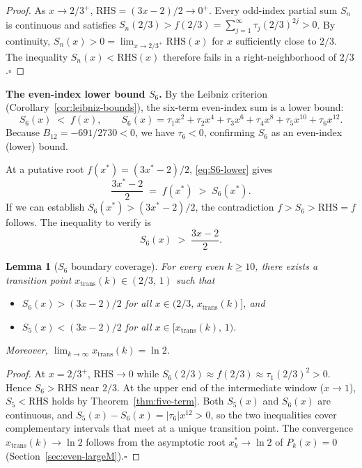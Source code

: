 \documentclass[12pt,a4paper]{article}
\theoremstyle{plain}
\newtheorem{lemma}[theorem]{Lemma}
\theoremstyle{definition}
\begin{document}
\begin{proof}
  As $x \to 2/3^+$, $\mathrm{RHS} = (3x-2)/2 \to 0^+$.
  Every odd-index partial sum $S_n$ is continuous and satisfies
  $S_n(2/3) > f(2/3) = \sum_{j=1}^{\infty} \tau_j (2/3)^{2j} > 0$.
  By continuity, $S_n(x) > 0 = \lim_{x \to 2/3^+} \mathrm{RHS}(x)$
  for $x$ sufficiently close to $2/3$.  The inequality
  $S_n(x) < \mathrm{RHS}(x)$ therefore fails in a right-neighborhood
  of $2/3$.\hfill$\square$
\end{proof}

\medskip
\noindent\textbf{The even-index lower bound $S_6$.}
By the Leibniz criterion (Corollary~\ref{cor:leibniz-bounds}),
the six-term even-index sum is a lower bound:
\begin{equation}\label{eq:S6-lower}
  S_6(x) \; < \; f(x), \qquad
  S_6(x) = \tau_1 x^2 + \tau_2 x^4 + \tau_3 x^6
          + \tau_4 x^8 + \tau_5 x^{10} + \tau_6 x^{12}.
\end{equation}
Because $B_{12} = -691/2730 < 0$, we have $\tau_6 < 0$, confirming
$S_6$ as an even-index (lower) bound.

At a putative root $f(x^*) = (3x^*-2)/2$, \eqref{eq:S6-lower} gives
\[
  \frac{3x^*-2}{2} \; = \; f(x^*) \; > \; S_6(x^*).
\]
If we can establish $S_6(x^*) > (3x^*-2)/2$, the contradiction
$f > S_6 > \mathrm{RHS} = f$ follows.  The inequality to verify is
\begin{equation}\label{eq:S6-bound-ineq}
  S_6(x) \; > \; \frac{3x-2}{2}.
\end{equation}

\begin{lemma}[$S_6$ boundary coverage]\label{lem:S6-boundary}
  For every even $k \ge 10$, there exists a transition point
  $x_{\mathrm{trans}}(k) \in (2/3,\, 1)$ such that
  \begin{itemize}[nosep]
    \item $S_6(x) > (3x-2)/2$ for all $x \in (2/3,\, x_{\mathrm{trans}}(k)]$, and
    \item $S_5(x) < (3x-2)/2$ for all $x \in [x_{\mathrm{trans}}(k),\, 1)$.
  \end{itemize}
  Moreover, $\lim_{k\to\infty} x_{\mathrm{trans}}(k) = \ln 2$.
\end{lemma}

\begin{proof}
  At $x = 2/3^+$, $\mathrm{RHS} \to 0$ while $S_6(2/3) \approx f(2/3)
  \approx \tau_1 (2/3)^2 > 0$.  Hence $S_6 > \mathrm{RHS}$ near $2/3$.
  At the upper end of the intermediate window ($x \to 1$), $S_5 < \mathrm{RHS}$
  holds by Theorem~\ref{thm:five-term}.  Both $S_5(x)$ and $S_6(x)$ are
  continuous, and $S_5(x) - S_6(x) = |\tau_6|x^{12} > 0$, so the two
  inequalities cover complementary intervals that meet at a unique
  transition point.  The convergence $x_{\mathrm{trans}}(k) \to \ln 2$
  follows from the asymptotic root $x^*_k \to \ln 2$ of $P_k(x) = 0$
  (Section~\ref{sec:even-largeM}).\hfill$\square$
\end{proof}
\end{document}
